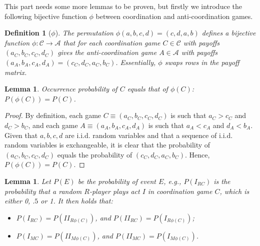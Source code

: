 \documentclass[fleqn,reqno,12pt]{article}
\theoremstyle{Satz}
\newtheorem{lemma}[theorem]{Lemma}
\newtheorem{definition}[theorem]{Definition}
\theoremstyle{Bsp}
\begin{document}
\noindent This part needs some more lemmas to be proven, but firstly we introduce
the following bijective function $\phi$ between coordination and
anti-coordination games.

\begin{definition}[$\phi$] \label{def:bijection phi} The permutation $\phi(a,b,c,d)=(c,d,a,b)$
  defines a bijective function $\phi:\mathcal{C}\rightarrow\mathcal{A}$ that for each
  coordination game $C\in\mathcal{C}$ with payoffs $(a_{C},b_{C},c_{C},d_{C})$ gives the
  anti-coordination game $A\in\mathcal{A}$ with payoffs
  $(a_{A},b_{A},c_{A},d_{A})=(c_{C},d_{C},a_{C},b_{C})$. Essentially, $\phi$ swaps rows
  in the payoff matrix.
\end{definition}

\begin{lemma} \label{lemma:probabilities coord-ant}
Occurrence probability of $C$ equals that of $\phi(C)$: $P(\phi(C))=P(C)$.
\end{lemma}

\begin{proof}
  By definition, each game $C\equiv(a_{C},b_{C},c_{C},d_{C})$ is such that $a_{C}>c_{C}$ and
  $d_{C}>b_{C}$, and each game $A\equiv(a_{A},b_{A},c_{A},d_{A})$ is such that $a_{A}<c_{A}$
  and $d_{A}<b_{A}$. Given that $a,b,c,d$ are i.i.d. random variables and that a sequence of
  i.i.d. random variables is exchangeable, it is clear that the probability of
  $(a_{C},b_{C},c_{C},d_{C})$ equals the probability of $(c_{C},d_{C},a_{C},b_{C})$.  Hence,
  $P(\phi(C))=P(C)$.
\end{proof}

\begin{lemma} \label{lemma:probabilities actions coord-ant} Let $P(E)$ be the probability of
  event $E$, e.g., $P(I_{RC})$ is the probability that a random $R$-player plays act $I$ in coordination game $C$, which is either 0, $.5$ or 1.  It then holds that:
\begin{itemize}
\item $P(I_{RC})=P(II_{R\phi(C)})$, and $P(II_{RC})=P(I_{R\phi(C)})$;
\item $P(I_{MC})=P(II_{M\phi(C)})$, and $P(II_{MC})=P(I_{M\phi(C)})$.
\end{itemize}
\end{lemma}
\end{document}
